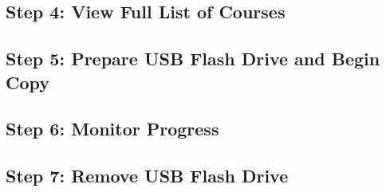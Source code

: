 \documentclass[]{article}
\begin{document}
\subsection{Step 4: View Full List of
Courses}\label{step-4-view-full-list-of-courses}

\subsection{Step 5: Prepare USB Flash Drive and Begin
Copy}\label{step-5-prepare-usb-flash-drive-and-begin-copy}

\subsection{Step 6: Monitor Progress}\label{step-6-monitor-progress}

\subsection{Step 7: Remove USB Flash
Drive}\label{step-7-remove-usb-flash-drive}
\end{document}
